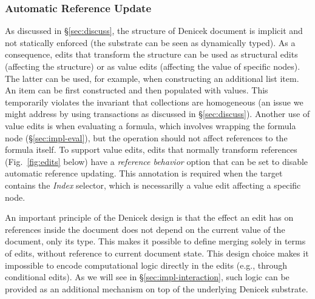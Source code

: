 \documentclass[sigconf,anonymous,screen]{acmart}
\newcommand{\ident}[1]{{\sffamily #1}}
\newcommand{\note}[1]{\textcolor{red}{#1}}
\begin{document}

\subsubsection*{Automatic Reference Update}
As discussed in \S\ref{sec:discuss}, the structure of Denicek document is implicit and not
statically enforced (the substrate can be seen as dynamically typed). As a consequence, edits
that transform the structure can be used as structural edits (affecting the structure)
or as value edits (affecting the value of specific nodes). The latter can be used, for example,
when constructing an additional list item. An item can be first constructed and then populated
with values. This temporarily violates the invariant that collections are homogeneous
(an issue we might address by using transactions as discussed in \S\ref{sec:discuss}).
Another use of value edits is when evaluating a formula, which involves wrapping the formula
node (\S\ref{sec:impl-eval}), but the operation should not affect references to the formula
itself. To support value edits, edits that normally transform references (Fig.~\ref{fig:edits} below)
have a \emph{reference behavior} option that can be set to disable automatic reference
updating. This annotation is required when the target contains the \emph{Index} selector,
which is necessarilly a value edit affecting a specific node.

%

An important principle of the Denicek design is that the effect an edit has on references inside
the document does not depend on the current value of the document, only its type. This makes it possible to
define merging solely in terms of edits, without reference to current document state.
This design choice makes it impossible to encode computational logic directly in the edits
(e.g., through conditional edits). As we will see in \S\ref{sec:impl-interaction}, such logic
can be provided as an additional mechanism on top of the underlying Denicek substrate.
\end{document}
